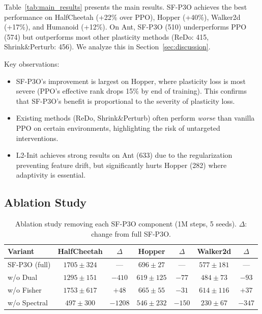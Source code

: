 \documentclass{article}
\begin{document}
Table~\ref{tab:main_results} presents the main results. SF-P3O achieves the best performance on HalfCheetah (+22\% over PPO), Hopper (+40\%), Walker2d (+17\%), and Humanoid (+12\%). On Ant, SF-P3O (510) underperforms PPO (574) but outperforms most other plasticity methods (ReDo: 415, Shrink\&Perturb: 456). We analyze this in Section~\ref{sec:discussion}.

Key observations:
\begin{itemize}
    \item SF-P3O's improvement is largest on Hopper, where plasticity loss is most severe (PPO's effective rank drops 15\% by end of training). This confirms that SF-P3O's benefit is proportional to the severity of plasticity loss.
    \item Existing methods (ReDo, Shrink\&Perturb) often perform \emph{worse} than vanilla PPO on certain environments, highlighting the risk of untargeted interventions.
    \item L2-Init achieves strong results on Ant (633) due to the regularization preventing feature drift, but significantly hurts Hopper (282) where adaptivity is essential.
\end{itemize}


\subsection{Ablation Study}

\begin{table}[t]
\centering
\caption{Ablation study removing each SF-P3O component (1M steps, 5 seeds). $\Delta$: change from full SF-P3O.}
\label{tab:ablation}
\begin{tabular}{lcccccc}
\toprule
\textbf{Variant} & \textbf{HalfCheetah} & $\Delta$ & \textbf{Hopper} & $\Delta$ & \textbf{Walker2d} & $\Delta$ \\
\midrule
SF-P3O (full)        & $1705 \pm 324$ & ---  & $696 \pm 27$  & ---  & $577 \pm 181$ & --- \\
\quad w/o Dual       & $1295 \pm 151$ & $-410$ & $619 \pm 125$ & $-77$  & $484 \pm 73$  & $-93$ \\
\quad w/o Fisher     & $1753 \pm 617$ & $+48$  & $665 \pm 55$  & $-31$  & $614 \pm 116$ & $+37$ \\
\quad w/o Spectral   & $497 \pm 300$  & $-1208$& $546 \pm 232$ & $-150$ & $230 \pm 67$  & $-347$ \\
\bottomrule
\end{tabular}
\end{table}
\end{document}
